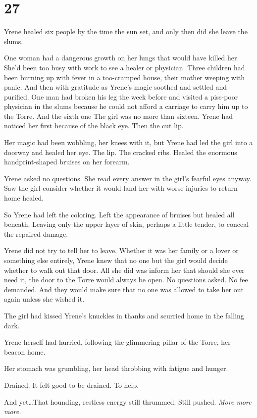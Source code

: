 
\chapter{27}

Yrene healed six people by the time the sun set, and only then did she leave the slums.

One woman had a dangerous growth on her lungs that would have killed her.
She'd been too busy with work to see a healer or physician.
Three children had been burning up with fever in a too-cramped house, their mother weeping with panic.
And then with gratitude as Yrene's magic soothed and settled and purified.
One man had broken his leg the week before and visited a piss-poor physician in the slums because he could not afford a carriage to carry him up to the Torre.
And the sixth one 
The girl was no more than sixteen.
Yrene had noticed her first because of the black eye.
Then the cut lip.

Her magic had been wobbling, her knees with it, but Yrene had led the girl into a doorway and healed her eye.
The lip.
The cracked ribs.
Healed the enormous handprint-shaped bruises on her forearm.

Yrene asked no questions.
She read every answer in the girl's fearful eyes anyway.
Saw the girl consider whether it would land her with worse injuries to return home healed.

So Yrene had left the coloring.
Left the appearance of bruises but healed all beneath.
Leaving only the upper layer of skin, perhaps a little tender, to conceal the repaired damage.

Yrene did not try to tell her to leave.
Whether it was her family or a lover or something else entirely, Yrene knew that no one but the girl would decide whether to walk out that door.
All she did was inform her that should she ever need it, the door to the Torre would always be open.
No questions asked.
No fee demanded.
And they would make sure that no one was allowed to take her out again unless she wished it.

The girl had kissed Yrene's knuckles in thanks and scurried home in the falling dark.

Yrene herself had hurried, following the glimmering pillar of the Torre, her beacon home.

Her stomach was grumbling, her head throbbing with fatigue and hunger.

Drained.
It felt good to be drained.
To help.

And yet\ldots That hounding, restless energy still thrummed.
Still pushed.
\emph{More more more.}


